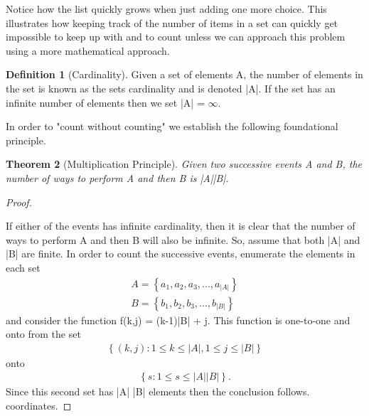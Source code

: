 \documentclass[10pt,]{book}
\theoremstyle{plain}
\newtheorem{theorem}{Theorem}[section]
\theoremstyle{definition}
\newtheorem{definition}[theorem]{Definition}
\theoremstyle{definition}
\numberwithin{equation}{section}
\begin{document}
Notice how the list quickly grows when just adding one more choice. This illustrates how keeping track of the number of items in a set can quickly get impossible to keep up with and to count unless we can approach this problem using a more mathematical approach.
%
\begin{definition}[Cardinality]\label{definition-1}
Given a set of elements A, the number of elements in the 
		set is known as the sets cardinality and is denoted |A|. If the set has 
		an infinite number of elements then we set |A| = \(\infty\).
		\end{definition}
\par
In order to "count without counting" we establish the following 
	foundational principle.%
\begin{theorem}[Multiplication Principle]\label{theorem-8}
Given two successive events A and B, the number of ways 
		to perform A and then B is |A||B|.
		\end{theorem}
\begin{proof}\hypertarget{proof-5}{}
If either of the events has infinite cardinality, then it is 
			clear
			that the number of ways to perform A and then B will also be 
			infinite. So, assume that both |A| and |B| are finite.
			In order to count the successive events, enumerate the elements in
			each set
			\begin{gather*}
A = \left \{ a_1, a_2, a_3, ... , a_{|A|} \right \}\\
B = \left \{  b_1, b_2, b_3, ... , b_{|B|} \right \}
\end{gather*}
			and consider the function f(k,j) = (k-1)|B| + j. This function is 
			one-to-one and onto from the set 
			\begin{gather*}
\left \{ (k,j): 1 \le k \le |A|, 1 \le j \le |B| \right \} 
\end{gather*} 
			onto 
			\begin{gather*}
\left \{ s : 1 \le s \le |A| |B| \right \}.
\end{gather*} 
			Since this
			second set has |A| |B| elements then the conclusion follows. 
			coordinates.%
\end{proof}
\end{document}
